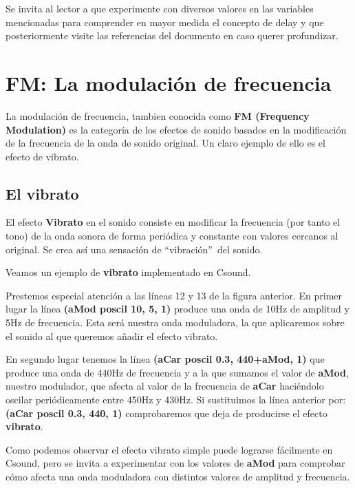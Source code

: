 
Se invita al lector a que experimente con diversos valores en las variables mencionadas para comprender en mayor medida el concepto de delay y que posteriormente visite las referencias del documento en caso querer profundizar.
\pagebreak

\section{FM: La modulación de frecuencia}

La modulación de frecuencia, tambien conocida como \textbf{FM (Frequency Modulation)} es la categoría de los efectos de sonido basados en la modificación de la frecuencia de la onda de sonido original. Un claro ejemplo de ello es el efecto de vibrato.

\subsection{El vibrato}

El efecto \textbf{Vibrato} en el sonido consiste en modificar la frecuencia (por tanto el tono) de la onda sonora de forma periódica y constante  con valores cercanos al original. Se crea así una sensación de ``vibración''\ del sonido. 

Veamos un ejemplo de \textbf{vibrato} implementado en Csound.

Prestemos especial atención a las líneas 12 y 13 de la figura anterior. En primer lugar la línea \textbf{(aMod poscil 10, 5, 1)} produce una onda de 10Hz de amplitud y 5Hz de frecuencia. Esta será nuestra onda moduladora, la que aplicaremos sobre el sonido al que queremos añadir el efecto vibrato.

En segundo lugar tenemos la línea \textbf{(aCar poscil 0.3, 440+aMod, 1)} que produce una onda de 440Hz de frecuencia y a la que sumamos el valor de \textbf{aMod}, nuestro modulador, que afecta al valor de la frecuencia de \textbf{aCar} haciéndolo oscilar periódicamente entre 450Hz y 430Hz.
Si sustituimos la línea anterior por: \textbf{(aCar poscil 0.3, 440, 1)} comprobaremos que deja de producirse el efecto \textbf{vibrato}.

Como podemos observar el efecto vibrato simple puede lograrse fácilmente en Csound, pero se invita a  experimentar con los valores de \textbf{aMod} para comprobar cómo afecta una onda moduladora con distintos valores de amplitud y frecuencia.
\pagebreak

